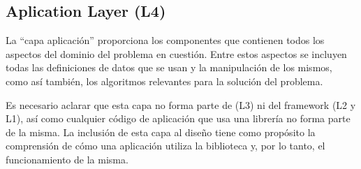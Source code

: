 \subsection{Aplication Layer (L4)}

La ``capa aplicación'' proporciona los componentes que contienen todos los aspectos del dominio del problema en cuestión. Entre estos
aspectos se incluyen todas las definiciones de datos que se usan y la manipulación de los mismos, como así también, los algoritmos
relevantes para la solución del problema.

Es necesario aclarar que esta capa no forma parte de \rc(L3) ni del framework \fud(L2 y L1), así como cualquier código de aplicación que
usa una librería no forma parte de la misma. La inclusión de esta capa al diseño tiene como propósito la comprensión de cómo una aplicación
utiliza la biblioteca y, por lo tanto, el funcionamiento de la misma.

